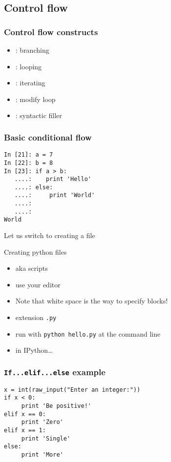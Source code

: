 \documentclass[14pt,compress]{beamer}
\newcommand{\typ}[1]{\texttt{#1}}
\newcommand{\kwrd}[1]{ \texttt{\textbf{\color{blue}{#1}}}  }
\begin{document}
\subsection{Control flow}
\begin{frame}
  \frametitle{Control flow constructs}  
  \begin{itemize}
  \item \kwrd{if/elif/else}: branching
  \item \kwrd{while}: looping
  \item \kwrd{for}: iterating 
  \item \kwrd{break, continue}: modify loop 
  \item \kwrd{pass}: syntactic filler
  \end{itemize}
\end{frame}

\begin{frame}[fragile]
  \frametitle{Basic conditional flow}
  \begin{lstlisting}
In [21]: a = 7
In [22]: b = 8
In [23]: if a > b:
   ....:    print 'Hello'
   ....: else:
   ....:     print 'World'
   ....:
   ....:
World
  \end{lstlisting}
  Let us switch to creating a file
\end{frame}

\begin{frame}
  {Creating python files}
  \begin{itemize}
    \item aka scripts
    \item use your editor
    \item Note that white space is the way to specify blocks!
    \item extension \typ{.py}
    \item run with \texttt{python hello.py} at the command line
    \item in IPython\ldots
  \end{itemize}
\end{frame}

\begin{frame}[fragile]
  \frametitle{\typ{If...elif...else} example}
\begin{lstlisting}
x = int(raw_input("Enter an integer:"))
if x < 0:
     print 'Be positive!'
elif x == 0:
     print 'Zero'
elif x == 1:
     print 'Single'
else:
     print 'More'
\end{lstlisting}
\end{frame}
\end{document}
